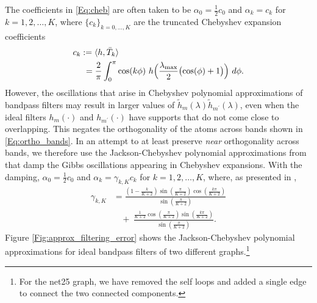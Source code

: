 \documentclass[journal, 10pt]{IEEEtran}
\begin{document}
The coefficients in \eqref{Eq:cheb} are often taken to be $\alpha_0=\frac{1}{2}c_0$ and $\alpha_k=c_k$ for $k=1,2,\ldots,K$, where  $\{c_k\}_{k=0,\ldots,K}$ are the truncated Chebyshev expansion coefficients 
\begin{align*}
c_{k}&:=\langle h , \bar{T}_k \rangle \\&~= \frac{2}{\pi}\int_{0}^{\pi}\cos(k\phi)~h\Bigl(\frac{\lambda_{\max}}{2} \bigl(\cos(\phi) +1\bigr)\Bigr)~d\phi.
\end{align*}
However, the oscillations that arise in Chebyshev polynomial approximations of bandpass filters may result in larger values of $\tilde{h}_m(\lambda)\tilde{h}_{m^{\prime}}(\lambda)$, even when the ideal filters $h_m(\cdot)$ and $h_{m^{\prime}}(\cdot)$ have supports that do not come close to overlapping. This negates the orthogonality of the atoms across bands shown in \eqref{Eq:ortho_bands}. In an attempt to at least preserve \emph{near} orthogonality across bands, we 
therefore use the Jackson-Chebyshev polynomial approximations from \cite{di2016efficient,puy_structured_sampling} that damp the Gibbs oscillations appearing in Chebyshev expansions. With the damping, $\alpha_0=\frac{1}{2}c_0$ and $\alpha_k=\gamma_{k,K}c_k$ for $k=1,2,\ldots,K$, where, as presented in \cite{di2016efficient}, 
\begin{align*}
\gamma_{k,K} &= \frac{\left(1-\frac{k}{K+2}\right)\sin\left(\frac{\pi}{K+2}\right)\cos\left(\frac{k\pi}{K+2}\right)}{\sin\left(\frac{\pi}{K+2}\right)} \\
&~~~~+~\frac{\frac{1}{K+2}\cos\left(\frac{\pi}{K+2}\right)\sin\left(\frac{k\pi}{K+2}\right)}{\sin\left(\frac{\pi}{K+2}\right)}.
\end{align*}
Figure \ref{Fig:approx_filtering_error} shows the Jackson-Chebyshev polynomial approximations for ideal bandpass filters of two different graphs.\footnote{For the net25 graph, we have removed the self loops and added a single edge to connect the two connected components.}
\end{document}
